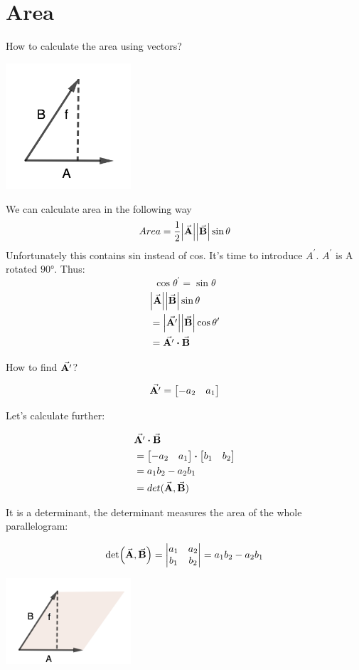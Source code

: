 \documentclass{article}
\begin{document}
    \section{Area}

    How to calculate the area using vectors?

    \includegraphics[width=0.35\textwidth]{fig_4.png}

    We can calculate area in the following way
    \[Area=\frac{1}{2}\abs{\va{A}}\abs{\va{B}}\sin{\theta}\]
    Unfortunately this contains sin instead of cos. It's time to introduce $A^\prime$.  $A^\prime$ is A rotated $\ang{90}$. Thus:
    \[\cos{\theta^\prime}=\sin{\theta}\]
    \begin{align}
        & \abs{\va{A}}\abs{\va{B}}\sin{\theta}\\
        & =\abs{\va{A^\prime}}\abs{\va{B}}\cos{\theta^\prime}\\
        & =\va{A^\prime}\vdot\va{B}
    \end{align}

    How to find $\va{A^\prime}$?

    \[\va{A^\prime}=\bmqty{-a_2 & a_1}\]

    Let's calculate further:

    \begin{align}
        & \va{A^\prime}\vdot\va{B}\\
        & =\bmqty{-a_2 & a_1}\vdot\bmqty{b_1 & b_2}\\
        & =a_1 b_2 - a_2 b_1 \\
        & =det(\va{A}, \va{B})
    \end{align}

    It is a determinant, the determinant measures the area of the whole parallelogram:

    \[\det(\va{A}, \va{B})= \mdet{a_1 & a_2 \\ b_1 & b_2}=a_1 b_2 - a_2 b_1\]

    \includegraphics[width=0.35\textwidth]{fig_5.png}
\end{document}
